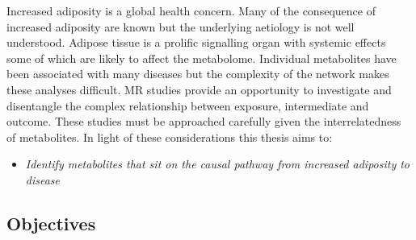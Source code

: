 \documentclass[11pt,twoside]{bristolthesis}
\providecommand{\tightlist}{%
  \setlength{\itemsep}{0pt}\setlength{\parskip}{0pt}}
\begin{document}
Increased adiposity is a global health concern. Many of the consequence of increased adiposity are known but the underlying aetiology is not well understood. Adipose tissue is a prolific signalling organ with systemic effects some of which are likely to affect the metabolome. Individual metabolites have been associated with many diseases but the complexity of the network makes these analyses difficult. MR studies provide an opportunity to investigate and disentangle the complex relationship between exposure, intermediate and outcome. These studies must be approached carefully given the interrelatedness of metabolites. In light of these considerations this thesis aims to:
\begin{itemize}
\tightlist
\item
  \emph{Identify metabolites that sit on the causal pathway from increased adiposity to disease}
\end{itemize}
\hypertarget{objectives}{%
\subsection{Objectives}\label{objectives}}
\end{document}
